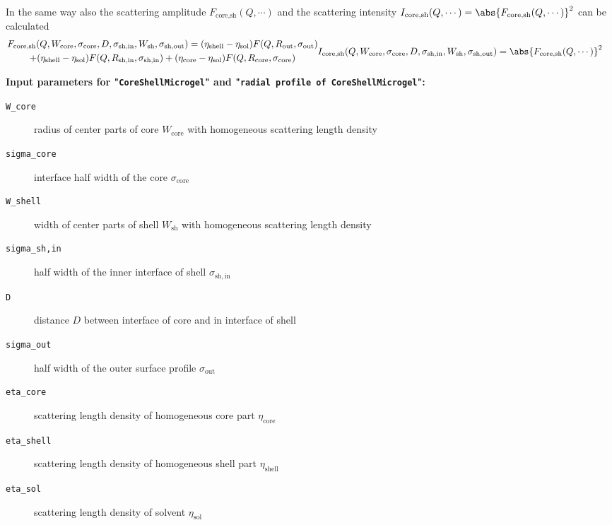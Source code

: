 In the same way also the scattering amplitude $F_\textrm{core,sh}(Q,\cdots)$ and the scattering intensity
$I_\textrm{core,sh}(Q,\cdots)=\abs{F_\textrm{core,sh}(Q,\cdots)}^2$ can be calculated
\begin{subequations}
\begin{multline}
F_\textrm{core,sh}(Q,W_\textrm{core},\sigma_\textrm{core},D,\sigma_\textrm{sh,in},W_\textrm{sh},\sigma_\textrm{sh,out}) =
  (\eta_\textrm{shell}-\eta_\textrm{sol}) F(Q,R_\textrm{out},\sigma_\textrm{out}) \\
+ (\eta_\textrm{shell}-\eta_\textrm{sol}) F(Q,R_\textrm{sh,in},\sigma_\textrm{sh,in})
+ (\eta_\textrm{core} -\eta_\textrm{sol}) F(Q,R_\textrm{core},\sigma_\textrm{core})
\end{multline}
\begin{align}
I_\textrm{core,sh}(Q,W_\textrm{core},\sigma_\textrm{core},D,\sigma_\textrm{sh,in},W_\textrm{sh},\sigma_\textrm{sh,out}) &=
\abs{F_\textrm{core,sh}(Q,\cdots)}^2
\end{align}
\end{subequations}

\vspace{5mm}

\noindent
\textbf{Input parameters for "\texttt{CoreShellMicrogel}" and "\texttt{radial profile of CoreShellMicrogel}":}
\begin{description}
    \item[\texttt{W\_core}] radius of center parts of core $W_\textrm{core}$ with homogeneous scattering length density
    \item[\texttt{sigma\_core}] interface half width of the core $\sigma_\mathrm{core}$
    \item[\texttt{W\_shell}] width of center parts of shell $W_\textrm{sh}$ with homogeneous scattering length density
    \item[\texttt{sigma\_sh,in}] half width of the inner interface of shell $\sigma_\mathrm{sh,in}$
    \item[\texttt{D}] distance $D$ between interface of core and in interface of shell
    \item[\texttt{sigma\_out}] half width of the outer surface profile $\sigma_\mathrm{out}$
    \item[\texttt{eta\_core}] scattering length density of homogeneous core part $\eta_\textrm{core}$
    \item[\texttt{eta\_shell}] scattering length density of homogeneous shell part $\eta_\textrm{shell}$
    \item[\texttt{eta\_sol}] scattering length density of solvent $\eta_\textrm{sol}$
\end{description}

